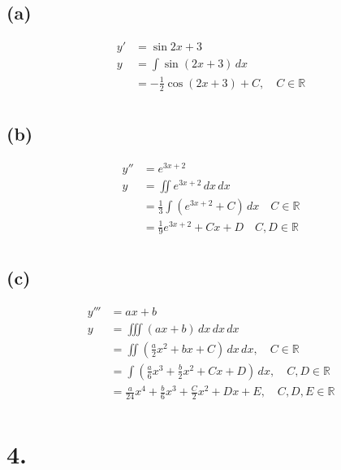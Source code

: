 \documentclass{article}
\begin{document}
\subsection*{(a)}

\begin{align*}
  y' &= \sin 2x + 3 \\
  y &= \int \sin (2x + 3) \,dx \\
    &= -\frac{1}{2} \cos(2x + 3) + C, \quad C \in \mathbb{R} \\
\end{align*}

\subsection*{(b)}

\begin{align*}
  y'' &= e^{3x+2} \\
  y &= \iint e^{3x+2} \,dx\,dx \\
    &= \frac{1}{3} \int (e^{3x+2} + C) \,dx \quad C \in \mathbb{R} \\
    &= \frac{1}{9} e^{3x+2} + Cx + D \quad C, D \in \mathbb{R} \\
\end{align*}

\subsection*{(c)}

\begin{align*}
  y''' &= ax + b \\
  y &= \iiint (ax + b) \,dx\,dx\,dx \\
    &= \iint (\frac{a}{2} x^2 + bx + C) \,dx\,dx, \quad C \in \mathbb{R} \\
    &= \int (\frac{a}{6} x^3 + \frac{b}{2} x^2 + Cx + D) \,dx, \quad C,D \in \mathbb{R} \\
    &= \frac{a}{24} x^4 + \frac{b}{6} x^3 + \frac{C}{2} x^2 + Dx + E, \quad C,D,E \in \mathbb{R} \\
\end{align*}

\section*{4.}
\end{document}
